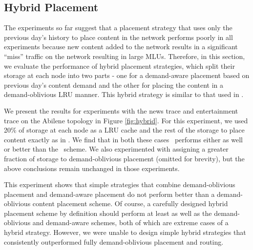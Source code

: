 



\eat
{
\label{sec:hybrid}
\subsection{Hybrid Placement} The experiments so far  suggest that a placement strategy that uses only the previous day's history to place content in the network performs poorly in all experiments because new content added to the network results in a significant ``miss'' traffic on the network resulting in large MLUs. Therefore, in this section, we evaluate the performance of hybrid placement strategies, which split their storage at each node into two parts - one for a demand-aware placement based on previous day's content demand and the other for placing the content in a demand-oblivious LRU manner. This hybrid strategy is similar to that used in \cite{Applegate2010}.

We present the results for experiments with the news trace and entertainment trace on the Abilene topology in Figure \ref{fig:hybrid}. For this experiment, we used 20\% of storage at each node as a LRU cache and the rest of the storage to place content exactly as in \optrp. We find that in both these cases \invlru\ performs either as well or better than the \optrp\ scheme. 
We also experimented with assigning a greater fraction of storage to demand-oblivious placement (omitted for brevity), but the above conclusions remain unchanged in those experiments. 

This experiment shows that simple strategies that combine demand-oblivious placement and demand-aware placement do not perform better than a demand-oblivious content placement scheme. Of course, a carefully designed hybrid placement scheme by definition should perform at least as well as the demand-oblivious and demand-aware schemes, both of which are extreme cases of a hybrid strategy. However, we were unable to design simple hybrid strategies that consistently outperformed fully demand-oblivious placement and routing.

}







